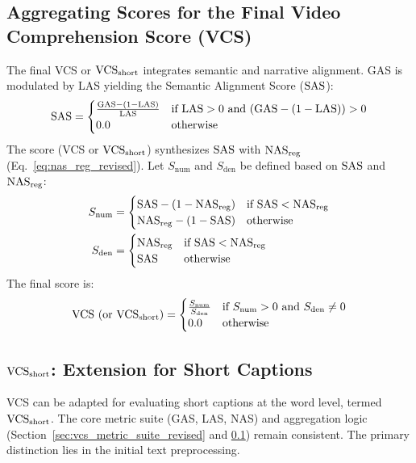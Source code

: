 \subsection{Aggregating Scores for the Final Video Comprehension Score (VCS)} %
\label{sec:aggregating_scores_revised} %
The final VCS or $\text{VCS}_{\text{short}}$ integrates semantic and narrative alignment. GAS is modulated by LAS yielding the Semantic Alignment Score ($\text{SAS}$):
\begin{equation} \label{eq:sas_revised} 
\text{SAS} = 
\begin{cases}
\frac{\text{GAS} - (1 - \text{LAS})}{\text{LAS}} & \text{if } \text{LAS} > 0 \text{ and } (\text{GAS} - (1 - \text{LAS})) > 0 \\
0.0 & \text{otherwise}
\end{cases}
\end{equation}
The score (VCS or $\text{VCS}_{\text{short}}$) synthesizes $\text{SAS}$ with $\text{NAS}_{\text{reg}}$ (Eq.~\ref{eq:nas_reg_revised}).
Let $S_{\text{num}}$ and $S_{\text{den}}$ be defined based on $\text{SAS}$ and $\text{NAS}_{\text{reg}}$:
\begin{align*}
S_{\text{num}} &= 
\begin{cases}
\text{SAS} - (1 - \text{NAS}_{\text{reg}}) & \text{if } \text{SAS} < \text{NAS}_{\text{reg}} \\
\text{NAS}_{\text{reg}} - (1 - \text{SAS}) & \text{otherwise}
\end{cases} \\
S_{\text{den}} &= 
\begin{cases}
\text{NAS}_{\text{reg}} & \text{if } \text{SAS} < \text{NAS}_{\text{reg}} \\
\text{SAS} & \text{otherwise}
\end{cases}
\end{align*}
The final score is:
\begin{equation} \label{eq:vcs_revised}
\text{VCS (or } \text{VCS}_{\text{short}}\text{)} =
\begin{cases}
\frac{S_{\text{num}}}{S_{\text{den}}} & \text{if } S_{\text{num}} > 0 \text{ and } S_{\text{den}} \neq 0 \\
0.0 & \text{otherwise}
\end{cases}
\end{equation}

\subsection{\texorpdfstring{$\text{VCS}_{\text{short}}$}{VCSshort}: Extension for Short Captions} %
\label{sec:vcs_short} %
VCS can be adapted for evaluating short captions at the word level, termed $\text{VCS}_{\text{short}}$. The core metric suite (GAS, LAS, NAS) and aggregation logic (Section~\ref{sec:vcs_metric_suite_revised} and \ref{sec:aggregating_scores_revised}) remain consistent. The primary distinction lies in the initial text preprocessing.

